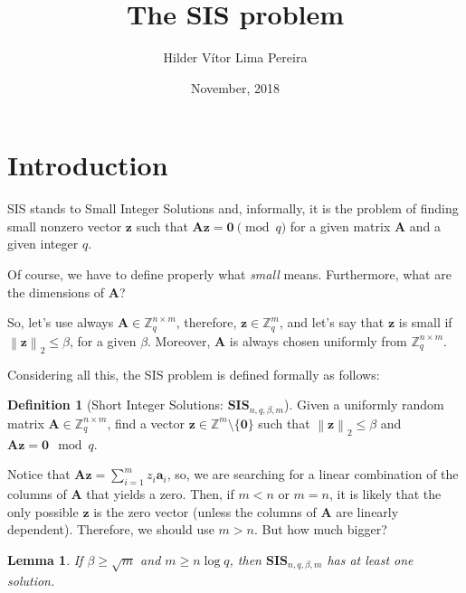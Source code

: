 \documentclass[a4paper,11pt]{article}
\title{The SIS problem}
\author{Hilder Vítor Lima Pereira}
\date{November, 2018}
\let\vec\mathbf %
\newcommand\Zqm{{\mathbb Z}_q^m}
\newcommand\Zm{{\mathbb Z}^m}
\newcommand\Zqnm{{\mathbb Z}_q^{n\times m}}
\newcommand\A{{\mathbf A}}
\newcommand\SIS{\textbf{SIS}_{n, q, \beta, m}}
\newcommand{\norm}[1]{\left\lVert #1 \right\rVert_2}
\newtheorem{lemma}[theorem]{Lemma}
\theoremstyle{definition}
\newtheorem{definition}{Definition}[section]
\theoremstyle{remark}
\begin{document}
\maketitle


\section{Introduction}

SIS stands to Small Integer Solutions and, informally, it is the problem of
finding small nonzero vector $\vec{z}$ such that $\vec{ A z} = \vec{0} \pmod q$
for a given matrix $\A$ and a given integer $q$.

Of course, we have to define properly what \emph{small} means. Furthermore,
what are the dimensions of $\A$?

So, let's use always $\A \in \Zqnm$, therefore, $\vec z \in \Zqm$, and let's
say that $\vec z$ is small if $\norm{\vec z} \le \beta$, for a given $\beta$.
Moreover, $\A$ is always chosen uniformly from $\Zqnm$.

Considering all this, the SIS problem is defined formally as follows:

\begin{definition}[Short Integer Solutions: $\SIS$] Given a uniformly random
matrix $\A \in \Zqnm$, find a vector $\vec z \in \Zm \setminus \{\vec 0\} $
such that
$\norm{\vec z} \le \beta$ and $\A \vec z = \vec 0 \mod q$.
\end{definition}

Notice that $\A \vec z = \sum_{i=1}^{m} z_i \vec{a}_i$, so, we are searching
for a linear combination of the columns of $\A$ that yields a zero. Then, if
$m<n$ or $m=n$, it is likely that the only possible $\vec z$ is the zero vector
(unless the columns of $\A$ are linearly dependent). Therefore, we should use
$m > n$. But how much bigger?

\begin{lemma}
If $\beta\ge \sqrt{m}$ and $m \ge n\log q$, then $\SIS$ has at least one 
solution.
\end{lemma}
\end{document}
